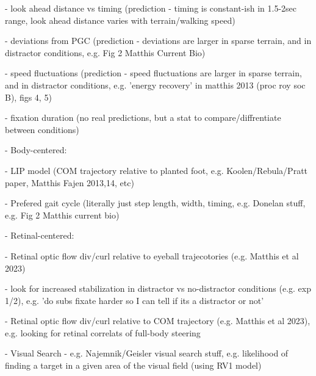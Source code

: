     - look ahead distance vs timing (prediction - timing is constant-ish in 1.5-2sec range, look ahead distance varies with terrain/walking speed)
    
    - deviations from PGC (prediction - deviations are larger in sparse terrain, and in distractor conditions, e.g. Fig 2 Matthis Current Bio)
    
    - speed fluctuations (prediction - speed fluctuations are larger in sparse terrain, and in distractor conditions, e.g. 'energy recovery' in matthis 2013 (proc roy soc B), figs 4, 5)
    
    - fixation duration (no real predictions, but a stat to compare/diffrentiate between conditions)
  
  - Body-centered:
  
      - LIP model (COM trajectory relative to planted foot, e.g. Koolen/Rebula/Pratt paper, Matthis Fajen 2013,14, etc)
      
      - Prefered gait cycle (literally just step length, width, timing, e.g. Donelan stuff, e.g. Fig 2 Matthis current bio)

  
  - Retinal-centered:
  
      - Retinal optic flow div/curl relative to eyeball trajecotories (e.g. Matthis et al 2023)
      
        - look for increased stabilization in distractor vs no-distractor conditions (e.g. exp 1/2), e.g. 'do subs fixate harder so I can tell if its a distractor or not'
        
        - Retinal optic flow div/curl relative to COM trajectory (e.g. Matthis et al 2023), e.g. looking for retinal correlats of full-body steering
      
      - Visual Search - e.g. Najemnik/Geisler visual search stuff, e.g. likelihood of finding a target in a given area of the visual field (using RV1 model)



% 
